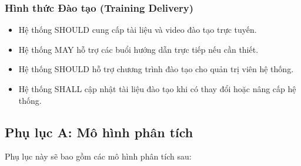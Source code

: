 \documentclass[12pt, a4paper]{article}
\begin{document}
\subsubsection{Hình thức Đào tạo (Training Delivery)}

\begin{itemize}
    \item Hệ thống SHOULD cung cấp tài liệu và video đào tạo trực tuyến.

    \item Hệ thống MAY hỗ trợ các buổi hướng dẫn trực tiếp nếu cần thiết.

    \item Hệ thống SHOULD hỗ trợ chương trình đào tạo cho quản trị viên hệ thống.

    \item Hệ thống SHALL cập nhật tài liệu đào tạo khi có thay đổi hoặc nâng cấp hệ thống.
\end{itemize}

\subsection{Phụ lục A: Mô hình phân tích }
\noindent Phụ lục này sẽ bao gồm các mô hình phân tích sau:
\end{document}
